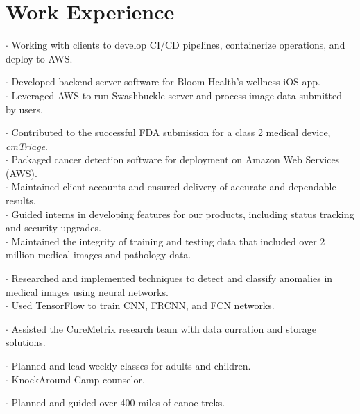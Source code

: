 \section{Work Experience}

$\cdot$ Working with clients to develop CI/CD pipelines, containerize operations, and deploy to AWS.

$\cdot$ Developed backend server software for Bloom Health's wellness iOS app.\\
$\cdot$ Leveraged AWS to run Swashbuckle server and process image data submitted by users.

$\cdot$ Contributed to the successful FDA submission for a class 2 medical device, {\it cmTriage}.\\
$\cdot$ Packaged cancer detection software for deployment on Amazon Web Services (AWS).\\
$\cdot$ Maintained client accounts and ensured delivery of accurate and dependable results.\\
$\cdot$ Guided interns in developing features for our products, including status tracking and security upgrades.\\
$\cdot$ Maintained the integrity of training and testing data that included over 2 million medical images and pathology data.

$\cdot$ Researched and implemented techniques to detect and classify anomalies in medical images using neural networks.\\
$\cdot$ Used TensorFlow to train CNN, FRCNN, and FCN networks.

$\cdot$ Assisted the CureMetrix research team with data curration and storage solutions.

$\cdot$ Planned and lead weekly classes for adults and children.\\
$\cdot$ KnockAround Camp counselor.

$\cdot$ Planned and guided over 400 miles of canoe treks.
